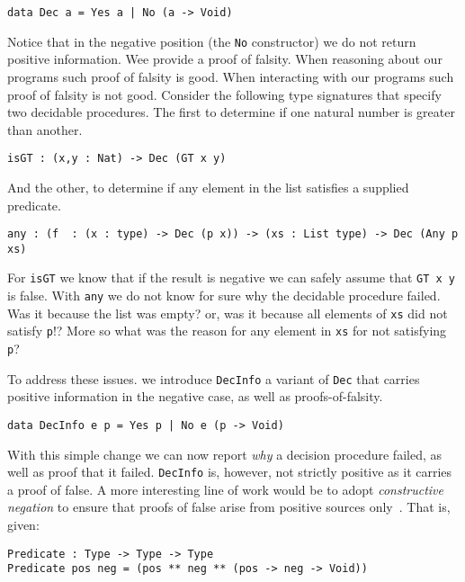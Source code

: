 \documentclass[%
draft,
a4paper,
UKenglish,
cleveref,
autoref,
thm-restate,
pdfa
]{oasics-v2021}
\begin{document}
\begin{verbatim}
data Dec a = Yes a | No (a -> Void)
\end{verbatim}

\noindent
Notice that in the negative position (the \texttt{No} constructor) we do not return positive information.
Wee provide a proof of falsity.
When reasoning about our programs such proof of falsity is good.
When interacting with our programs such proof of falsity is not good.
Consider the following type signatures that specify two decidable procedures.
The first to determine if one natural number is greater than another.

\begin{verbatim}
isGT : (x,y : Nat) -> Dec (GT x y)
\end{verbatim}

\noindent
And the other, to determine if any element in the list satisfies a supplied predicate.

\begin{verbatim}
any : (f  : (x : type) -> Dec (p x)) -> (xs : List type) -> Dec (Any p xs)
\end{verbatim}

For \texttt{isGT} we know that if the result is negative we can safely assume that \texttt{GT x y} is false.
With \texttt{any} we do not know for sure why the decidable procedure failed.
Was it because the list was empty?
or,
was it because all elements of \texttt{xs} did not satisfy \texttt{p}!?
More so what was the reason for any element in \texttt{xs} for not satisfying \texttt{p}?

To address these issues. we introduce \texttt{DecInfo} a variant of \texttt{Dec} that carries positive information in the negative case, as well as proofs-of-falsity.

\begin{verbatim}
data DecInfo e p = Yes p | No e (p -> Void)
\end{verbatim}

With this simple change we can now report \emph{why} a decision procedure failed, as well as proof that it failed.
\texttt{DecInfo} is, however, not strictly positive as it carries a proof of false.
A more interesting line of work would be to adopt \emph{constructive negation} to ensure that proofs of false arise from positive sources only~\cite{msfp/Atkey22}.
That is, given:

\begin{verbatim}
Predicate : Type -> Type -> Type
Predicate pos neg = (pos ** neg ** (pos -> neg -> Void))
\end{verbatim}
\end{document}
